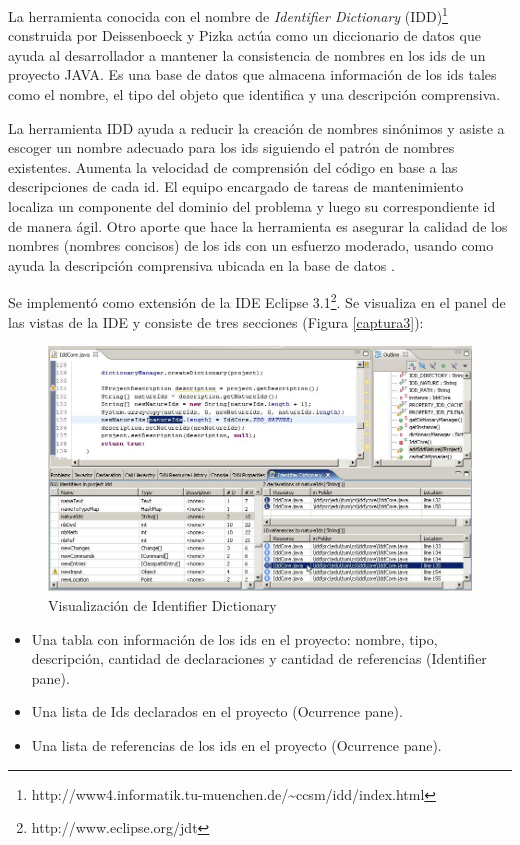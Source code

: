 \documentclass[a4paper,12pt]{report}
\begin{document}
La herramienta conocida con el nombre de \textit{Identifier Dictionary} (IDD)\footnote[1]{http://www4.informatik.tu-muenchen.de/\~{}ccsm/idd/index.html} construida por Deissenboeck y Pizka \cite{DFPM05} actúa como un diccionario de datos que ayuda al desarrollador a mantener la consistencia de nombres en los ids de un proyecto JAVA. Es una base de datos que almacena información de los ids tales como el nombre, el tipo del objeto que identifica y una descripción comprensiva.

La herramienta IDD ayuda a reducir la creación de nombres sinónimos y asiste a escoger un nombre adecuado para los ids siguiendo el patrón de nombres existentes. Aumenta la velocidad de comprensión del código en base a las descripciones de cada id. El equipo encargado de tareas de mantenimiento localiza un componente del dominio del problema y luego su correspondiente id de manera ágil. Otro aporte que hace la herramienta es asegurar la calidad de los nombres (nombres concisos) de los ids con un esfuerzo moderado, usando como ayuda la descripción comprensiva ubicada en la base de datos \cite{DFPM05,LFBEX07}.

Se implementó como extensión de la IDE Eclipse 3.1\footnote[2]{http://www.eclipse.org/jdt}. Se visualiza en el panel de las vistas de la IDE y consiste de tres secciones (Figura \ref{captura3}):

\begin{figure}[t] %
\centerline{%
\includegraphics[scale= 0.50]{./idd_3.png}
}
\caption{Visualización de Identifier Dictionary}
\label{captura4}
\end{figure} 

\begin{itemize}
\itemsep0em%
\item Una tabla con información de los ids en el proyecto: nombre, tipo, descripción, cantidad de declaraciones y cantidad de referencias (Identifier pane).
\item Una lista de Ids declarados en el proyecto (Ocurrence pane).
\item Una lista de referencias de los ids en el proyecto (Ocurrence pane).
\end{itemize}
\end{document}
